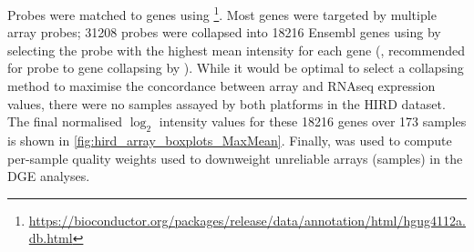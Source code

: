 Probes were matched to genes using \footnote{\url{https://bioconductor.org/packages/release/data/annotation/html/hgug4112a.db.html}}.
Most genes were targeted by multiple array probes; \num{31208} probes were collapsed into \num{18216} Ensembl genes using by selecting the probe with the highest mean intensity for each gene (, recommended for probe to gene collapsing by \textcite{miller2011StrategiesAggregatingGene}).
While it would be optimal to select a collapsing method to maximise the concordance between array and \gls{RNAseq} expression values, there were no samples assayed by both platforms in the \gls{HIRD} dataset.
The final normalised $\log_2$ intensity values for these \num{18216} genes over 173 samples is shown in \cref{fig:hird_array_boxplots_MaxMean}.
Finally,  \autocite{ritchie2006EmpiricalArrayQuality} was used to compute per-sample quality weights used to downweight unreliable arrays (samples) in the \gls{DGE} analyses.

